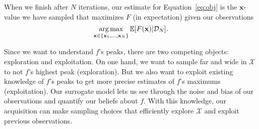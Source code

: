 When we finish after $N$ iterations, our estimate for Equation~\ref{eq:obj} is
the $\mathbf{x}$-value we have sampled that maximizes $F$ (in expectation) given our observations
\begin{equation*}
    \operatorname*{arg\,max}_{\mathbf{x} \in \{ \mathbf{x}_1, \dots, \mathbf{x}_N \} } \mathbb{E}[F(\mathbf{x}) | \mathcal{D}_N].
\end{equation*}

Since we want to understand $f$'s peaks,
there are two competing objects: exploration and exploitation.
On one hand, we want to sample far and wide in $\mathcal{X}$ to not $f$'s highest peak (exploration).
But we also want to exploit existing knowledge of $f$'s peaks to get more precise estimates of $f$'s maximums (exploitation).
Our surrogate model lets us see through the noise and bias of our observations and quantify our beliefs about $f$.
With this knowledge, our acquisition can make sampling choices that efficiently explore $\mathcal{X}$ and exploit previous observations.

